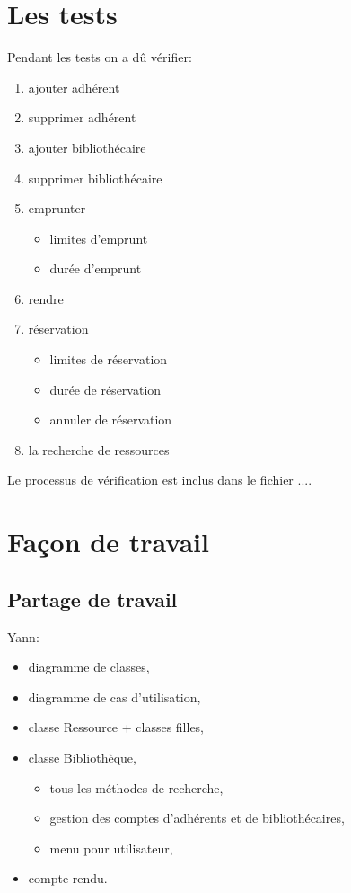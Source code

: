 \documentclass[10pt, a4paper]{article}
\begin{document}
	\section{Les tests}
	Pendant les tests on a dû vérifier:
	\begin{enumerate}
		\item ajouter adhérent
		\item supprimer adhérent
		\item ajouter bibliothécaire
		\item supprimer bibliothécaire
		\item emprunter
		\begin{itemize}
			\item limites d'emprunt
			\item durée d'emprunt
		\end{itemize}
		\item rendre
		\item réservation
		\begin{itemize}
			\item limites de réservation
			\item durée de réservation
			\item annuler de réservation
		\end{itemize}
		\item la recherche de ressources 
	\end{enumerate}
	
	
	Le processus de vérification est inclus dans le fichier ....
	
	\section{Façon de travail}
		\subsection{Partage de travail}
		Yann:
		\begin{itemize}
			\item diagramme de classes,
			\item diagramme de cas d'utilisation,
			\item classe Ressource + classes filles,
			\item classe Bibliothèque,
			\begin{itemize}
				\item tous les méthodes de recherche,
				\item gestion des comptes d'adhérents et de bibliothécaires,
				\item menu pour utilisateur,
			\end{itemize}
			\item compte rendu.
		\end{itemize}
		
\end{document}
